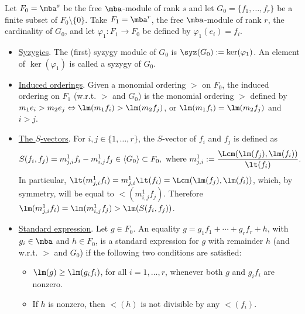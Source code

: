 \begin{definitions}\label{secondsetofdefinitions}
Let $F_0=\mba^s$ be the free $\mba$-module of rank $s$ and let
$G_0=\{f_1,\ldots ,f_r\}$ be a finite subset of
$F_0\setminus\{0\}$. Take $F_1=\mba^r$, the free $\mba$-module of rank $r$,
the cardinality of $G_0$, and let $\varphi_1:F_1\rightarrow F_0$ be
defined by $\varphi_1(e_i)=f_i$.
\begin{itemize}
\item[$(5)$] \underline{\sc Syzygies}. The (first) syzygy module of
  $G_0$ is $\syz(G_0):=\ker(\varphi_1)$. An element of $\ker(\varphi_1)$ is
  called a syzygy of $G_0$.
\item[$(6)$] \underline{\sc Induced orderings}. Given a monomial
  ordering $>$ on $F_0$, the induced ordering on $F_1$ (w.r.t. $>$ and
  $G_0$) is the monomial ordering $>$ defined by
  $m_1e_i>m_2e_j\Leftrightarrow \lm(m_1f_i)>\lm(m_2f_j)$, or
  $\lm(m_1f_i)=\lm(m_2f_j)$ and $i>j$.
\item[$(7)$] \underline{\sc The $S$-vectors}. For $i,j\in\{ 1,\ldots
  ,r\}$, the $S$-vector of $f_i$ and $f_j$ is defined as
\begin{eqnarray*}
S(f_i,f_j)=m^1_{j,i}f_i-m^1_{i,j}f_j\in \langle G_0 \rangle\subset
F_0,\mbox{ where } m^1_{j,i}:=\frac{\Lcm(\lm(f_j),\lm(f_i))}{\lt(f_i)}.
\end{eqnarray*}
In particular,
$\lt(m^1_{j,i}f_i)=m^1_{j,i}\lt(f_i)=\Lcm(\lm(f_j),\lm(f_i))$, which,
by symmetry, will be equal to $\lt(m^1_{i,j}f_j)$. Therefore
$\lm(m^1_{j,i}f_i)=\lm(m^1_{i,j}f_j)>\lm(S(f_i,f_j))$.
\item[$(8)$] \underline{\sc Standard expression}. Let $g\in F_0$. An
  equality $g=g_1f_1+\cdots +g_rf_r+h$, with $g_i\in \mba$ and $h\in
  F_0$, is a standard expression for $g$ with remainder $h$ (and
  w.r.t. $>$ and $G_0$) if the following two conditions are satisfied:
\begin{itemize}
\item[$(a)$] $\lm(g)\geq \lm(g_if_i)$, for all $i=1,\ldots ,r$,
  whenever both $g$ and $g_if_i$ are nonzero.
\item[$(b)$] If $h$ is nonzero, then $\lt(h)$ is not divisible by any
  $\lt(f_i)$.
\end{itemize}
\end{itemize}
\end{definitions}

